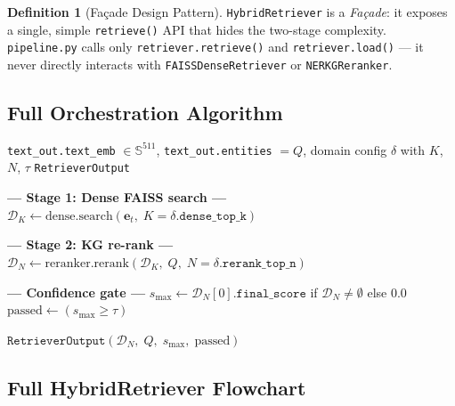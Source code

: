 \documentclass[12pt,a4paper]{article}
\theoremstyle{definition}
\newtheorem{definition}[theorem]{Definition}
\theoremstyle{remark}
\begin{document}
\begin{definition}[Façade Design Pattern]
\texttt{HybridRetriever} is a \emph{Façade}: it exposes a single, simple
\texttt{retrieve()} API that hides the two-stage complexity.
\texttt{pipeline.py} calls only \texttt{retriever.retrieve()} and
\texttt{retriever.load()} --- it never directly interacts with
\texttt{FAISSDenseRetriever} or \texttt{NERKGReranker}.
\end{definition}

\subsection{Full Orchestration Algorithm}

\begin{algorithm}[H]
\caption{\texttt{HybridRetriever.retrieve}(\textit{text\_out}, $\delta$)}
\label{alg:hybrid_retrieve}
\begin{algorithmic}[1]
\Require \texttt{text\_out.text\_emb} $\in \mathbb{S}^{511}$,
         \texttt{text\_out.entities} $= Q$,
         domain config $\delta$ with $K$, $N$, $\tau$
\Ensure \texttt{RetrieverOutput}

\State \textbf{--- Stage 1: Dense FAISS search ---}
\State $\mathcal{D}_K \gets \text{dense.search}(\mathbf{e}_t,\; K = \delta.\texttt{dense\_top\_k})$

\State \textbf{--- Stage 2: KG re-rank ---}
\State $\mathcal{D}_N \gets \text{reranker.rerank}(\mathcal{D}_K,\; Q,\; N = \delta.\texttt{rerank\_top\_n})$

\State \textbf{--- Confidence gate ---}
\State $s_{\max} \gets \mathcal{D}_N[0].\texttt{final\_score}$
       if $\mathcal{D}_N \neq \emptyset$ else $0.0$
\State $\text{passed} \gets (s_{\max} \geq \tau)$

\State \Return $\texttt{RetrieverOutput}(\mathcal{D}_N,\; Q,\; s_{\max},\; \text{passed})$
\end{algorithmic}
\end{algorithm}

\subsection{Full HybridRetriever Flowchart}
\end{document}
